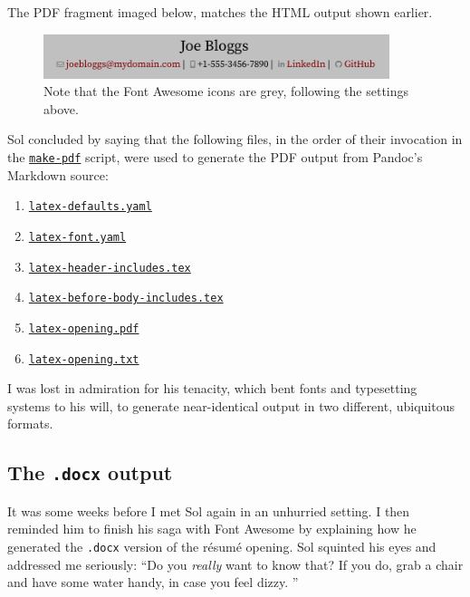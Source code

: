 \documentclass[
  british,
  a4paper,
  rgb,
  dvipsnames,
  svgnames,
  hyphens]{article}
\providecommand{\tightlist}{%
  \setlength{\itemsep}{0pt}\setlength{\parskip}{0pt}}
\begin{document}
The PDF fragment imaged below, matches the HTML output shown earlier.

\begin{figure}
\centering
\includegraphics[width=0.9\textwidth,height=\textheight]{images/opening-pdf.png}
\caption{Note that the Font Awesome icons are grey, following the
settings above.}
\end{figure}

Sol concluded by saying that the following files, in the order of their
invocation in the \href{auxiliary/make-pdf}{\texttt{make-pdf}} script,
were used to generate the PDF output from Pandoc's Markdown source:

\begin{enumerate}
\tightlist
\item
  \href{auxiliary/latex-defaults.yaml}{\texttt{latex-defaults.yaml}}
\item
  \href{auxiliary/latex-font.yaml}{\texttt{latex-font.yaml}}
\item
  \href{auxiliary/latex-header-includes.tex}{\texttt{latex-header-includes.tex}}
\item
  \href{auxiliary/latex-before-body-includes.tex}{\texttt{latex-before-body-includes.tex}}
\item
  \href{auxiliary/latex-opening.pdf}{\texttt{latex-opening.pdf}}
\item
  \href{auxiliary/latex-opening.txt}{\texttt{latex-opening.txt}}
\end{enumerate}

I was lost in admiration for his tenacity, which bent fonts and
typesetting systems to his will, to generate near-identical output in
two different, ubiquitous formats.

\hypertarget{the-.docx-output}{%
\subsection{\texorpdfstring{The \texttt{.docx}
output}{The .docx output}}\label{the-.docx-output}}

It was some weeks before I met Sol again in an unhurried setting. I then
reminded him to finish his saga with Font Awesome by explaining how he
generated the \texttt{.docx} version of the résumé opening. Sol squinted
his eyes and addressed me seriously: ``Do you \emph{really} want to know
that? If you do, grab a chair and have some water handy, in case you
feel dizzy.  \normalfont''
\end{document}
